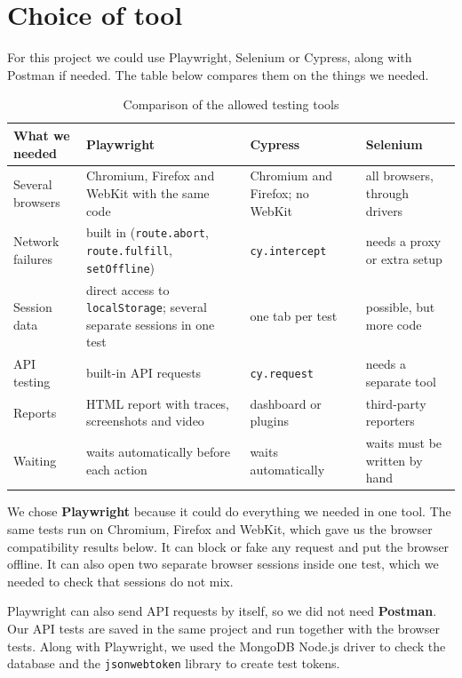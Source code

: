 \documentclass[12pt,a4paper,oneside]{report}
\newcommand{\code}[1]{\texttt{#1}}
\begin{document}
\section{Choice of tool}

For this project we could use Playwright, Selenium or Cypress, along with
Postman if needed. The table below compares them on the things we needed.

\begin{table}[H]
\centering
\small
\begin{tabularx}{\textwidth}{>{\raggedright\arraybackslash}p{3.4cm}>{\raggedright\arraybackslash}X>{\raggedright\arraybackslash}X>{\raggedright\arraybackslash}X}
\toprule
\textbf{What we needed} & \textbf{Playwright} & \textbf{Cypress} & \textbf{Selenium} \\
\midrule
Several browsers & Chromium, Firefox and WebKit with the same code & Chromium and Firefox; no WebKit & all browsers, through drivers \\
Network failures & built in (\code{route.abort}, \code{route.fulfill}, \code{setOffline}) & \code{cy.intercept} & needs a proxy or extra setup \\
Session data & direct access to \code{localStorage}; several separate sessions in one test & one tab per test & possible, but more code \\
API testing & built-in API requests & \code{cy.request} & needs a separate tool \\
Reports & HTML report with traces, screenshots and video & dashboard or plugins & third-party reporters \\
Waiting & waits automatically before each action & waits automatically & waits must be written by hand \\
\bottomrule
\end{tabularx}
\caption{Comparison of the allowed testing tools}
\end{table}

We chose \textbf{Playwright} because it could do everything we needed in one
tool. The same tests run on Chromium, Firefox and WebKit, which gave us the
browser compatibility results below. It can block or fake any request and put
the browser offline. It can also open two separate browser sessions inside one
test, which we needed to check that sessions do not mix.

Playwright can also send API requests by itself, so we did not need
\textbf{Postman}. Our API tests are saved in the same project and run together
with the browser tests. Along with Playwright, we used the MongoDB Node.js
driver to check the database and the \code{jsonwebtoken} library to create
test tokens.
\end{document}

